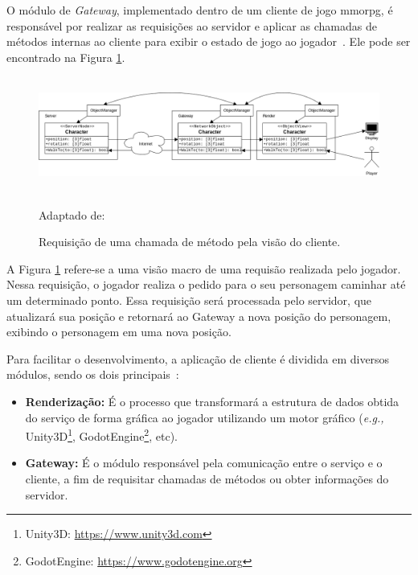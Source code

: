 O módulo de \textit{Gateway}, implementado dentro de um cliente de jogo \ac{mmorpg}, é responsável por realizar as requisições ao servidor e aplicar as chamadas de métodos internas ao cliente para exibir o estado de jogo ao jogador~\cite{albion_online_unite}.
%
Ele pode ser encontrado na Figura \ref{fig:gateway}.


\begin{figure}[htb!]
\caption{Requisição de uma chamada de método pela visão do cliente.}
\label{fig:gateway}
\includegraphics[height=3.8cm]{img/cap2/gateway.png}
\centering

Adaptado de:~\cite{albion_online_unite}
\end{figure}



A Figura \ref{fig:gateway} refere-se a uma visão macro de uma requisão realizada pelo jogador.
%
Nessa requisição, o jogador realiza o pedido para o seu personagem caminhar até um determinado ponto.
%
Essa requisição será processada pelo servidor, que atualizará sua posição e retornará ao Gateway a nova posição do personagem, exibindo o personagem em uma nova posição.



Para facilitar o desenvolvimento, a aplicação de cliente é dividida em diversos módulos, sendo os dois principais~\cite{albion_online_unite}:



\begin{itemize}
  \item \textbf{Renderização:} É o processo que transformará a estrutura de dados obtida do serviço de forma gráfica ao jogador utilizando um motor gráfico (\textit{e.g.,} Unity3D\footnote{Unity3D: \url{https://www.unity3d.com}}, GodotEngine\footnote{GodotEngine: \url{https://www.godotengine.org}}, etc).
  \item \textbf{Gateway:} É o módulo responsável pela comunicação entre o serviço e o cliente, a fim de requisitar chamadas de métodos ou obter informações do servidor.
\end{itemize}




